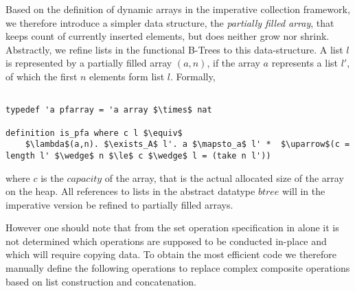 Based on the definition of dynamic arrays in the 
imperative collection framework,
we therefore introduce a simpler data structure,
the \textit{partially filled array},
that keeps count of currently inserted elements,
but does neither grow nor shrink.
Abstractly, we refine lists in the functional B-Trees to this
data-structure.
A list $l$ is represented by a partially filled array $(a,n)$,
if the array $a$ represents a list $l'$, of which the first $n$
elements form list $l$.
Formally,

\begin{lstlisting}[mathescape=true, language=Isabelle]

typedef 'a pfarray = 'a array $\times$ nat

definition is_pfa where c l $\equiv$
    $\lambda$(a,n). $\exists_A$ l'. a $\mapsto_a$ l' *  $\uparrow$(c = length l' $\wedge$ n $\le$ c $\wedge$ l = (take n l'))
\end{lstlisting}

where $c$ is the $capacity$ of the array, that is the actual allocated size
of the array on the heap.
All references to lists in the abstract datatype $btree$
will in the imperative version be refined to partially filled arrays.

However one should note that
from the set operation specification in  alone
it is not determined which operations are supposed to be conducted
in-place and which will require copying data.
To obtain the most efficient code we therefore manually
define the following operations to replace complex composite
operations based on list construction and concatenation.

